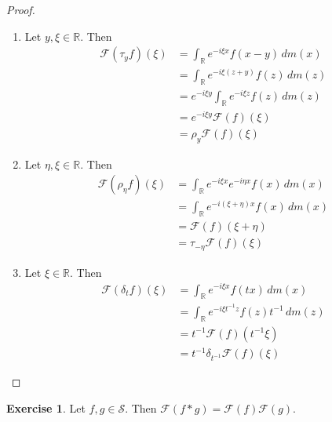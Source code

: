 \documentclass[12pt]{amsart}
\theoremstyle{definition}
\newtheorem{ex}[definition]{Exercise}
\newcommand{\del}{\delta}
\newcommand{\R}{\mathbb{R}}
\newcommand{\MF}{\mathcal{F}}
\newcommand{\MS}{\mathcal{S}}
\newcommand{\dm}{\, d m}
\begin{document}
	\begin{proof}\
		\begin{enumerate}
			\item Let $y, \xi \in \R$. Then 
			\begin{align*}
				\MF(\tau_yf)(\xi) 
				& = \int_{\R} e^{-i\xi x} f(x-y) \dm(x) \\
				& = \int_{\R} e^{-i\xi (z+y)} f(z) \dm(z) \\
				& = e^{-i\xi y} \int_{\R} e^{-i\xi z} f(z) \dm(z) \\
				& = e^{-i\xi y} \MF(f)(\xi) \\
				& = \rho_{y} \MF(f)(\xi)
			\end{align*}
			\item Let $\eta, \xi \in \R$. Then 
			\begin{align*}
				\MF(\rho_{\eta}f)(\xi) 
				& = \int_{\R} e^{-i\xi x} e^{-i\eta x}f(x) \dm(x) \\
				& = \int_{\R} e^{-i(\xi + \eta)x} f(x) \dm(x) \\
				& = \MF(f)(\xi + \eta) \\
				&= \tau_{-\eta}\MF(f)(\xi)
			\end{align*}
			\item Let $\xi \in \R$. Then 
			\begin{align*}
				\MF(\del_t f)(\xi) 
				& = \int_{\R} e^{-i\xi x} f(tx) \dm(x) \\
				& = \int_{\R} e^{-i\xi t^{-1} z} f(z) t^{-1}\dm(z) \\
				& = t^{-1}\MF(f)(t^{-1} \xi) \\
				& = t^{-1} \del_{t^{-1}} \MF(f)(\xi)
			\end{align*}
		\end{enumerate}
	\end{proof}

	\begin{ex}
		Let $f,g \in \MS$. Then $\MF(f*g) = \MF(f)\MF(g)$.
	\end{ex}
\end{document}
